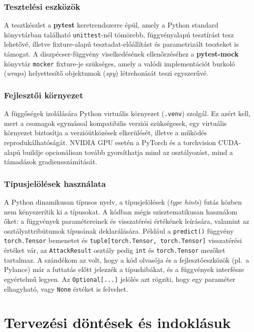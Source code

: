 \subsubsection{Tesztelési eszközök}
A tesztkészlet a \textbf{pytest} keretrendszerre épül, amely a Python standard könyvtárban található \texttt{unittest}-nél 
tömörebb, függvényalapú tesztírást tesz lehetővé, illetve fixture-alapú tesztadat-előállítást és parametrizált teszteket is 
támogat. 
A diszpécser-függvény viselkedésének ellenőrzéséhez a \textbf{pytest-mock} könyvtár \texttt{mocker} fixture-je szükséges, amely 
a valódi implementációt burkoló (\textit{wraps}) helyettesítő objektumok (\textit{spy}) létrehozását teszi egyszerűvé. 

\subsubsection{Fejlesztői környezet}
A függőségek izolálására Python virtuális környezet (\texttt{.venv}) szolgál. 
Ez azért kell, mert a csomagok egymással kompatibilis verziói szükségesek, egy virtuális környezet biztosítja a verzióütközések 
elkerülését, illetve a működés reprodukálhatóságát. 
NVIDIA GPU esetén a PyTorch és a torchvision CUDA-alapú buildje opcionálisan tovább gyorsíthatja mind az osztályozást, 
mind a támadások gradiensszámítását. 

\subsubsection{Típusjelölések használata}
A Python dinamikusan típusos nyelv, a típusjelölések (\textit{type hints}) futás közben nem kényszerítik ki a típusokat. 
A kódban mégis szisztematikusan használom őket: a függvények paramétereinek és visszatérési értékének leírására, valamint az 
osztályattribútumok típusának deklarálására. 
Például a \texttt{predict()} függvény \texttt{torch.Tensor} bemenetet és \texttt{tuple[torch.Tensor, torch.Tensor]} visszatérési 
értéket vár, az \texttt{AttackResult} osztály pedig \texttt{int} és \texttt{torch.Tensor} mezőket tartalmaz. 
A szándékom az volt, hogy a kód olvasója és a fejlesztőeszközök (pl.\ a Pylance) már a futtatás előtt jelezzék a típushibákat, 
és a függvények interfésze egyértelmű legyen. 
Az \texttt{Optional[...]} jelölés azt rögzíti, hogy egy paraméter elhagyható, vagy \texttt{None} értéket is felvehet. 

\section{Tervezési döntések és indoklásuk}

